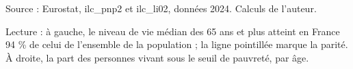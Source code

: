 Source : Eurostat, ilc\_pnp2 et ilc\_li02, données 2024. Calculs de l'auteur.\par Lecture : à gauche, le niveau de vie médian des 65 ans et plus atteint en France 94 \% de celui de l'ensemble de la population ; la ligne pointillée marque la parité. À droite, la part des personnes vivant sous le seuil de pauvreté, par âge.
